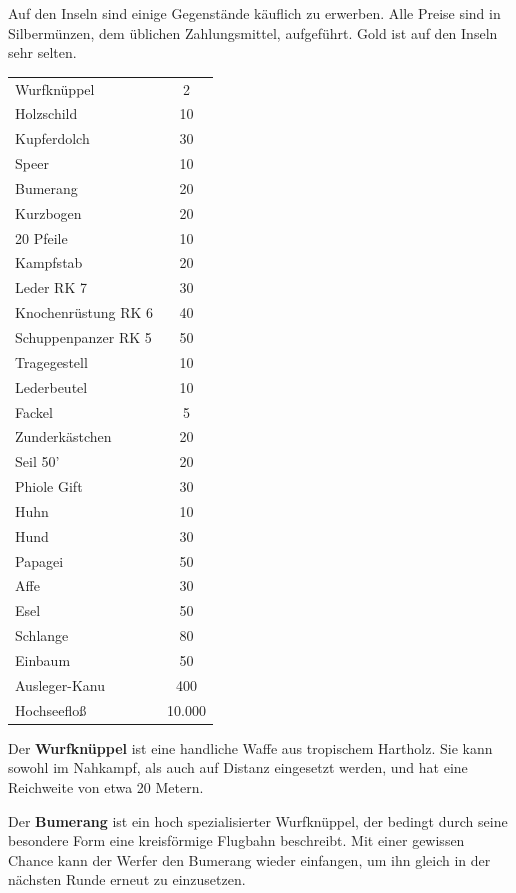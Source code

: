 \documentclass[11pt]{wbzine}
\begin{document}
\begin{multicols}{2}


Auf den Inseln sind einige Gegenstände käuflich zu erwerben. 
Alle Preise sind in Silbermünzen, dem üblichen Zahlungsmittel,
aufgeführt. Gold ist auf den Inseln sehr selten.

\begin{tabularx}{\columnwidth}{Zc}
    Wurfknüppel & 2\\
    Holzschild     & 10\\
    Kupferdolch     &30\\
    Speer           &10\\
    Bumerang        &20\\
    Kurzbogen       &20\\
    20 Pfeile       &10\\
    Kampfstab       &20\\
    Leder RK 7           &   30\\
    Knochenrüstung RK 6            &40\\
    Schuppenpanzer RK 5     &50\\
    Tragegestell    &10\\
    Lederbeutel     &10\\
    Fackel         & 5\\
    Zunderkästchen  &20\\
    Seil 50'        &20\\
    Phiole Gift     &30\\
    Huhn         &10\\
    Hund            & 30\\
    Papagei          &50\\
    Affe          &30\\
    Esel          &50\\
    Schlange         &  80\\
    Einbaum         &50\\
    Ausleger-Kanu   &400\\
    Hochseefloß      &10.000\\
\end{tabularx}

Der \textbf{Wurfknüppel} ist eine handliche Waffe aus tropischem
Hartholz. Sie kann sowohl im Nahkampf, als auch auf Distanz
eingesetzt werden, und hat eine Reichweite von etwa 20 Metern.

Der \textbf{Bumerang} ist ein hoch spezialisierter Wurfknüppel, der
bedingt durch seine besondere Form eine kreisförmige Flugbahn
beschreibt. Mit einer gewissen Chance kann der Werfer den Bumerang
wieder einfangen, um ihn gleich in der nächsten Runde erneut zu
einzusetzen.


\end{multicols}
\end{document}
